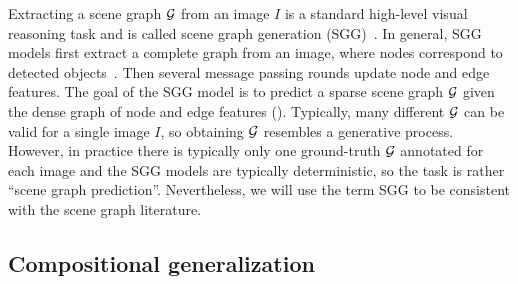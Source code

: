Extracting a scene graph $\cal G$ from an image $I$ is a standard high-level visual reasoning task and is called scene graph generation (SGG)~\citep{xu2017scene}. In general, SGG models first extract a complete graph from an image, where nodes correspond to detected objects~\citep{zellers2018neural,yang2018graph}. Then several message passing rounds update node and edge features. The goal of the SGG model is to predict a sparse scene graph $\cal G$ given the dense graph of node and edge features (\fig{\ref{fig:overview_sg}}).
Typically, many different $\cal G$ can be valid for a single image $I$, so obtaining $\cal G$ resembles a generative process. However, in practice there is typically only one ground-truth $\cal G$ annotated for each image and the SGG models are typically deterministic, so the task is rather ``scene graph prediction''. Nevertheless, we will use the term SGG to be consistent with the scene graph literature.


\subsection{Compositional generalization\label{sec:bg_comp_gen}}

